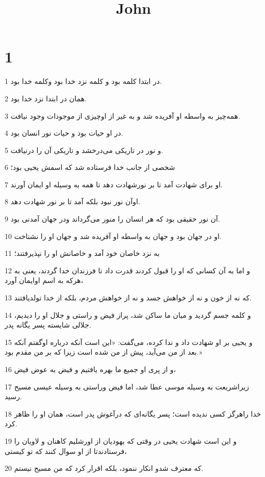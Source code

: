 

\title{John}


\chapter{1}

\par 1 در ابتدا کلمه بود و کلمه نزد خدا بود وکلمه خدا بود.
\par 2 همان در ابتدا نزد خدا بود.
\par 3 همه‌چیز به واسطه او آفریده شد و به غیر از اوچیزی از موجودات وجود نیافت.
\par 4 در او حیات بود و حیات نور انسان بود.
\par 5 و نور در تاریکی می‌درخشد و تاریکی آن را درنیافت.
\par 6 شخصی از جانب خدا فرستاده شد که اسمش یحیی بود؛
\par 7 او برای شهادت آمد تا بر نورشهادت دهد تا همه به وسیله او ایمان آورند.
\par 8 اوآن نور نبود بلکه آمد تا بر نور شهادت دهد.
\par 9 آن نور حقیقی بود که هر انسان را منور می‌گرداند ودر جهان آمدنی بود.
\par 10 او در جهان بود و جهان به واسطه او آفریده شد و جهان او را نشناخت.
\par 11 به نزد خاصان خود آمد و خاصانش او را نپذیرفتند؛
\par 12 و اما به آن کسانی که او را قبول کردند قدرت داد تا فرزندان خدا گردند، یعنی به هر‌که به اسم اوایمان آورد،
\par 13 که نه از خون و نه از خواهش جسد و نه از خواهش مردم، بلکه از خدا تولدیافتند.
\par 14 و کلمه جسم گردید و میان ما ساکن شد، پراز فیض و راستی و جلال او را دیدیم، جلالی شایسته پسر یگانه پدر.
\par 15 و یحیی بر او شهادت داد و ندا کرده، می‌گفت: «این است آنکه درباره اوگفتم آنکه بعد از من می‌آید، پیش از من شده است زیرا که بر من مقدم بود.»
\par 16 و از پری او جمیع ما بهره یافتیم و فیض به عوض فیض،
\par 17 زیراشریعت به وسیله موسی عطا شد، اما فیض وراستی به وسیله عیسی مسیح رسید.
\par 18 خدا راهرگز کسی ندیده است؛ پسر یگانه‌ای که درآغوش پدر است، همان او را ظاهر کرد.
\par 19 و این است شهادت یحیی در وقتی که یهودیان از اورشلیم کاهنان و لاویان را فرستادندتا از او سوال کنند که تو کیستی،
\par 20 که معترف شدو انکار ننمود، بلکه اقرار کرد که من مسیح نیستم.
